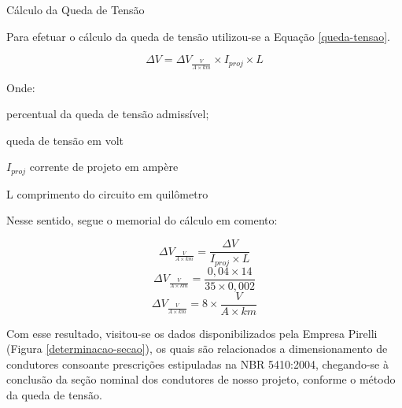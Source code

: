 \begin{description}

\item Cálculo da Queda de Tensão
	
	Para efetuar o cálculo da queda de tensão utilizou-se a Equação \ref{queda-tensao}.

\begin{equation}
	\Delta V = \Delta V_{\frac{V}{A \times km}} \times I_{proj} \times L
	\label{queda-tensao}
\end{equation}

Onde:

\begin{description}
	\item [$\Delta V$] percentual da queda de tensão admissível;
	\item [$\Delta V_{\frac{V}{A \times km}}$] queda de tensão em volt
	\item $I_{proj}$ corrente de projeto em ampère
	\item L comprimento do circuito em quilômetro
\end{description}

Nesse sentido, segue o memorial do cálculo em comento:

\begin{equation}
	\Delta V_{\frac{V}{A \times km}} = \frac{\Delta V} {I_{proj} \times L}
\end{equation}
\begin{equation}
	\Delta V_{\frac{V}{A \times km}} = \frac{0,04 \times 14}{35 \times 0,002}
\end{equation}
\begin{equation}
	\Delta V_{\frac{V}{A \times km}} = 8 \times \frac{V}{A \times km}
\end{equation}

\end{description}

Com esse resultado, visitou-se os dados disponibilizados pela Empresa Pirelli (Figura \ref{determinacao-secao}), os quais são relacionados a dimensionamento de condutores consoante prescrições estipuladas na NBR 5410:2004, chegando-se à conclusão da seção nominal dos condutores de nosso projeto, conforme o método da queda de tensão.

